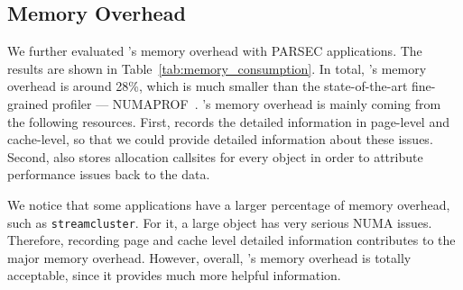 
\subsection{Memory Overhead}
\label{sec:memory}


We further evaluated \NP{}'s memory overhead with PARSEC applications. The results are shown in Table~\ref{tab:memory_consumption}. In total, \NP{}'s memory overhead is around 28\%, which is much smaller than the state-of-the-art fine-grained profiler --- NUMAPROF~\cite{valat:2018:numaprof}. \NP{}'s memory overhead is mainly coming from the following resources. First, \NP{} records the detailed information in page-level and cache-level, so that we could provide detailed information about these issues. Second, \NP{} also stores allocation callsites for every object in order to attribute performance issues back to the data. 

We  notice that some applications have a larger percentage of memory overhead, such as \texttt{streamcluster}. For it, a large object has very serious NUMA issues. Therefore, recording page and cache level detailed information contributes to the major memory overhead. However, overall, \NP{}'s memory overhead is totally acceptable, since it provides much more helpful information. 


